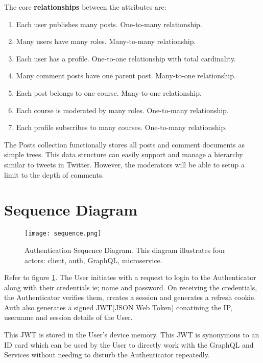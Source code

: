 The core \textbf{relationships} between the attributes are:
\begin{enumerate}
    \item Each user publishes many posts. One-to-many relationship.
    \item Many users have many roles. Many-to-many relationship.
    \item Each user has a profile. One-to-one relationship with total cardinality.
    \item Many comment posts have one parent post. Many-to-one relationship.
    \item Each post belongs to one course. Many-to-one relationship.
    \item Each course is moderated by many roles. One-to-many relationship.
    \item Each profile subscribes to many courses. One-to-many relationship.
\end{enumerate}

The Posts collection functionally stores all posts and comment documents as simple trees. This data structure can easily support 
and manage a hierarchy similar to tweets in Twitter. However, the moderators will be able to setup a limit to the depth of comments.

\section{Sequence Diagram}

\begin{figure}[h!]
    \begin{center}
        \texttt{[image: sequence.png]}
    \end{center}
    \caption{Authentication Sequence Diagram. This diagram illustrates 
    four actors: client, auth, GraphQL, microservice.}
    \label{fig:sequence}
\end{figure}

Refer to figure \ref{fig:sequence}.
The User initiates with a request to login to the Authenticator along with their credentials ie; name and password.
On receiving the credentials, the Authenticator verifies them, creates a session and generates a refresh cookie.
Auth also generates a signed JWT(JSON Web Token) conatining the IP, username and session details of the User.

This JWT is stored in the User's device memory. This JWT is synonymous to an ID card which can be used by 
the User to directly work with the GraphQL and Services without needing to disturb the Authenticator repeatedly.

